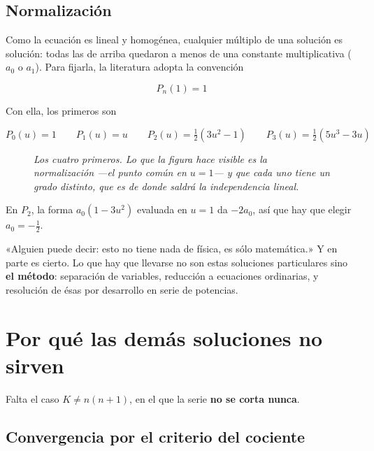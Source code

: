 \documentclass[12pt,a4paper]{article}
\begin{document}
\subsection{Normalización}

Como la ecuación es lineal y homogénea, cualquier múltiplo de una solución es
solución: todas las de arriba quedaron a menos de una constante multiplicativa
($a_0$ o $a_1$). Para fijarla, la literatura adopta la convención

\[
\boxed{\;P_n(1) = 1\;}
\]

Con ella, los primeros son

\[
P_0(u) = 1
\qquad
P_1(u) = u
\qquad
P_2(u) = \tfrac{1}{2}\left(3u^2 - 1\right)
\qquad
P_3(u) = \tfrac{1}{2}\left(5u^3 - 3u\right)
\]

\begin{figure}[H]
  \centering
  
  \caption*{\small\itshape Los cuatro primeros. Lo que la figura hace visible es
  la normalización ---el punto común en $u=1$--- y que cada uno tiene un grado
  distinto, que es de donde saldrá la independencia lineal.}
\end{figure}

\begin{notebox}
En $P_2$, la forma $a_0(1-3u^2)$ evaluada en $u=1$ da $-2a_0$, así que hay que
elegir $a_0 = -\tfrac12$.
\end{notebox}

\begin{notebox}
«Alguien puede decir: esto no tiene nada de física, es sólo matemática.» Y en
parte es cierto. Lo que hay que llevarse no son estas soluciones particulares sino
\textbf{el método}: separación de variables, reducción a ecuaciones ordinarias, y
resolución de ésas por desarrollo en serie de potencias.
\end{notebox}

\section{Por qué las demás soluciones no sirven}

Falta el caso $K \neq n(n+1)$, en el que la serie \textbf{no se corta nunca}.

\subsection{Convergencia por el criterio del cociente}
\end{document}
